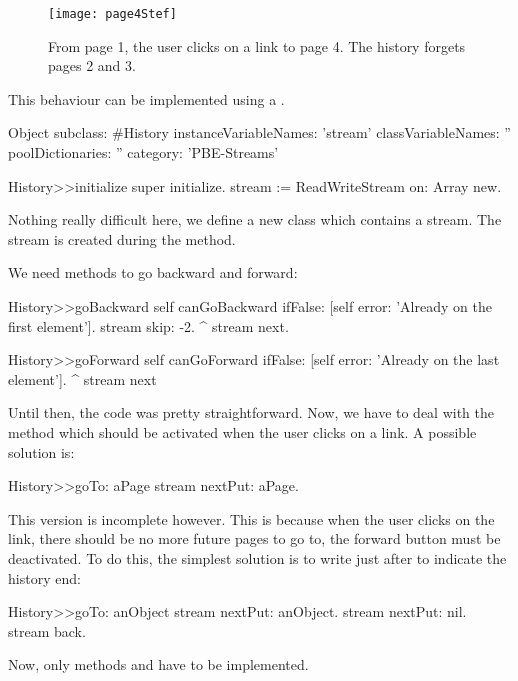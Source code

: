 \documentclass[a4paper,10pt,twoside]{book}
\begin{document}
\begin{figure}[!ht]
\centerline{\texttt{[image: page4Stef]}}
\caption{From page 1, the user clicks on a link to page 4. The history forgets pages 2 and 3.}
\vspace{.2in}
\end{figure}

This behaviour can be implemented using a .

\begin{code}{}
Object subclass: #History
  instanceVariableNames: 'stream'
  classVariableNames: ''
  poolDictionaries: ''
  category: 'PBE-Streams'

History>>initialize
    super initialize.
    stream := ReadWriteStream on: Array new.
\end{code}

Nothing really difficult here, we define a new class which contains a
stream. The stream is created during the  method.

We need methods to go backward and forward:

\begin{code}{}
History>>goBackward
  self canGoBackward ifFalse: [self error: 'Already on the first element'].
  stream skip: -2.
  ^ stream next.

History>>goForward
  self canGoForward ifFalse: [self error: 'Already on the last element'].
  ^ stream next
\end{code}

Until then, the code was pretty straightforward. Now, we have to deal
with the  method which should be activated when the user
clicks on a link. A possible solution is:

\begin{code}{}
History>>goTo: aPage
    stream nextPut: aPage.
\end{code}

This version is incomplete however. This is because when the user
clicks on the link, there should be no more future pages to go to,
\ie the forward button must be deactivated. To do this, the simplest
solution is to write  just after to indicate the history end:

\begin{code}{}
History>>goTo: anObject
  stream nextPut: anObject.
  stream nextPut: nil.
  stream back.
\end{code}

Now, only methods  and  have to be
implemented.
\end{document}
